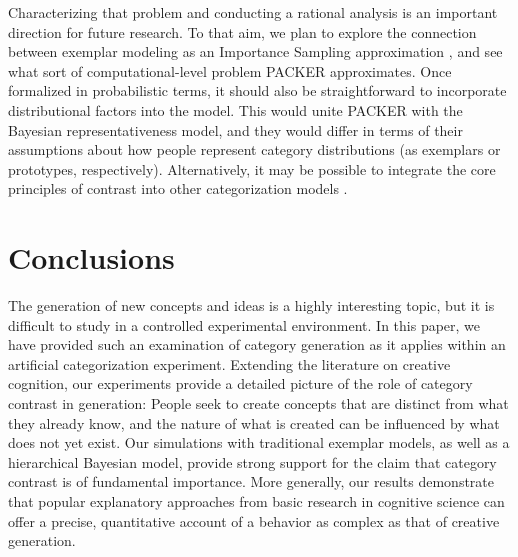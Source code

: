 \documentclass[12pt]{article}
\begin{document}
\begin{flushleft}
Characterizing that problem and conducting a rational analysis is an important direction for future research. To that aim, we plan to explore the connection between exemplar modeling as an Importance Sampling approximation \citep{shi10exemplar}, and see what sort of computational-level problem PACKER approximates. Once formalized in probabilistic terms, it should also be straightforward to incorporate distributional factors into the model. This would unite PACKER with the Bayesian representativeness model, and they would differ in terms of their assumptions about how people represent category distributions (as exemplars or prototypes, respectively). Alternatively, it may be possible to integrate the core principles of contrast into other categorization models \citep[e.g.,][]{love2004sustain,kurtz2007divergent,smith2000thirty}.




\section{Conclusions}

The generation of new concepts and ideas is a highly interesting topic, but it is difficult to study in a controlled experimental environment. In this paper, we have provided such an examination of category generation as it applies within an artificial categorization experiment. Extending the literature on creative cognition, our experiments provide a detailed picture of the role of category contrast in generation: People seek to create concepts that are distinct from what they already know, and the nature of what is created can be influenced by what does not yet exist. Our simulations with traditional exemplar models, as well as a hierarchical Bayesian model, provide strong support for the claim that category contrast is of fundamental importance. More generally, our results demonstrate that popular explanatory approaches from basic research in cognitive science can offer a precise, quantitative account of a behavior as complex as that of creative generation.



\end{flushleft}
\end{document}
